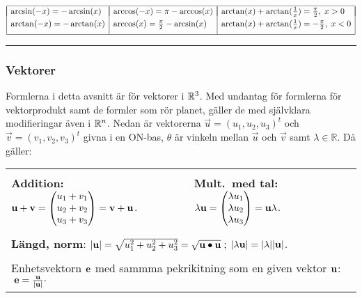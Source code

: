 \documentclass{article}
\begin{document}
\vspace{1 mm}

$\begin{array}{|l|l|l|}\hline & & \\*[-11pt]
\arcsin(-x)=-\arcsin(x) & \arccos(-x)=\pi-\arccos(x) & 
  \arctan(x)+\arctan(\tfrac1x)=\frac\pi2, \; x>0 \EndRow %
\arctan(-x)=-\arctan(x) &\arccos(x)=\frac{\pi}{2}-\arcsin(x) & 
  \arctan(x)+\arctan(\tfrac1x)=-\frac\pi2, \; x < 0 \\*[6pt] %
\hline
\end{array}$%

\vspace{2mm}\hrule


\subsubsection*{Vektorer}%

Formlerna i detta avsnitt är för vektorer i ${\mathbb R}^3$. Med
undantag för formlerna för vektorprodukt samt de formler som rör
planet, gäller de med självklara modifieringar även i ${\mathbb R}^n$.
Nedan är vektorerna $\vec u=(u_1,u_2,u_3)^t$ och $\vec
v=(v_1,v_2,v_3)^t$ givna i en ON-bas, $\theta$ är vinkeln mellan
$\vec u$ och $\vec v$ samt $\lambda\in\mathbb R$. Då gäller:

\medskip
\begin{tabular}{|l|l|}
  \hline  &  \\[-8pt]
  \textbf{Addition: } 
  $\bdu+\bdv=\trevektor[u_1+v_1,u_2+v_2,u_3+v_3]=\bdv + \bdu$.
  &
  \textbf{Mult.~med tal: }
  $\lambda\bdu=\trevektor[\lambda u_1,\lambda u_2,\lambda u_3] = \bdu\lambda$.
  \\[15pt] \hline \multicolumn{2}{|c|}{} \\[-9pt]
  \multicolumn{2}{|l|}{\textbf{Längd, norm}: \;
  $|{\mathbf u}|
    =\sqrt{u_1^2+u_2^2+u_3^2} 
  = \sqrt{{\mathbf u}\bullet{\mathbf u}}$\,; 
    \; $|\lambda{\mathbf u}|=|\lambda||{\mathbf u}|$.
  } %
  \\[8pt] \hline \multicolumn{2}{|c|}{} \\[-9pt]
  \multicolumn{2}{|l|}{Enhetsvektorn \/${\mathbf e}$\/ 
  med sammma pekrikitning som en given vektor ${\mathbf u}$:
  $
  \; {\mathbf e} = \frac{{\mathbf u}}{|{\mathbf u}|}\cdot
  $
  } %
  \\[8pt] \hline
\end{tabular}%
\end{document}
